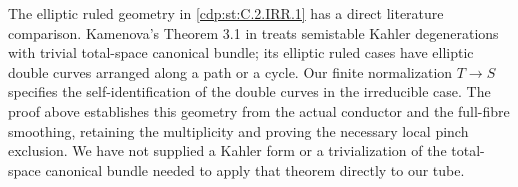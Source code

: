 The elliptic ruled geometry in \ref{cdp:st:C.2.IRR.1} has a direct literature
comparison. Kamenova's Theorem 3.1 in \cite{KamenovaTori} treats
semistable Kahler degenerations with trivial total-space canonical
bundle; its elliptic ruled cases have elliptic double curves arranged
along a path or a cycle. Our finite normalization $T\to S$ specifies
the self-identification of the double curves in the irreducible case.
The proof above establishes this geometry from the actual conductor
and the full-fibre smoothing, retaining the multiplicity and proving
the necessary local pinch exclusion. We have not supplied a Kahler
form or a trivialization of the total-space canonical bundle needed
to apply that theorem directly to our tube. 


